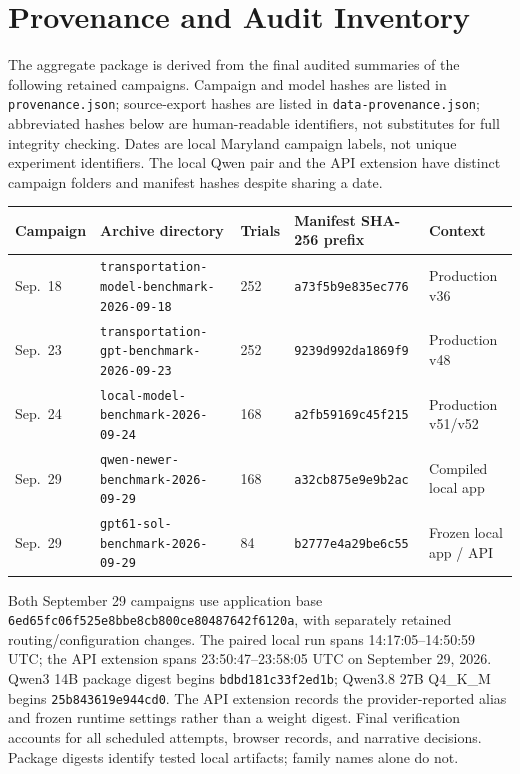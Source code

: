 \documentclass[10pt,twocolumn,letterpaper]{article}
\begin{document}
\section{Provenance and Audit Inventory}\label{app:provenance}
The aggregate package is derived from the final audited summaries of the following retained campaigns. Campaign and model hashes are listed in \texttt{provenance.json}; source-export hashes are listed in \texttt{data-provenance.json}; abbreviated hashes below are human-readable identifiers, not substitutes for full integrity checking. Dates are local Maryland campaign labels, not unique experiment identifiers. The local Qwen pair and the API extension have distinct campaign folders and manifest hashes despite sharing a date.
\begin{center}\small
\begin{tabularx}{\textwidth}{@{}lXlll@{}}
\toprule Campaign & Archive directory & Trials & Manifest SHA-256 prefix & Context\\\midrule
Sep.\ 18 & \texttt{transportation-model-benchmark-2026-09-18} & 252 & \texttt{a73f5b9e835ec776} & Production v36\\
Sep.\ 23 & \texttt{transportation-gpt-benchmark-2026-09-23} & 252 & \texttt{9239d992da1869f9} & Production v48\\
Sep.\ 24 & \texttt{local-model-benchmark-2026-09-24} & 168 & \texttt{a2fb59169c45f215} & Production v51/v52\\
Sep.\ 29 & \texttt{qwen-newer-benchmark-2026-09-29} & 168 & \texttt{a32cb875e9e9b2ac} & Compiled local app\\
Sep.\ 29 & \texttt{gpt61-sol-benchmark-2026-09-29} & 84 & \texttt{b2777e4a29be6c55} & Frozen local app / API\\\bottomrule
\end{tabularx}\end{center}
Both September 29 campaigns use application base \texttt{6ed65fc06f525e8bbe8cb800ce80487642f6120a}, with separately retained routing/configuration changes. The paired local run spans 14:17:05--14:50:59 UTC; the API extension spans 23:50:47--23:58:05 UTC on September 29, 2026. Qwen3 14B package digest begins \texttt{bdbd181c33f2ed1b}; Qwen3.8 27B Q4\_K\_M begins \texttt{25b843619e944cd0}. The API extension records the provider-reported alias and frozen runtime settings rather than a weight digest. Final verification accounts for all scheduled attempts, browser records, and narrative decisions. Package digests identify tested local artifacts; family names alone do not.
\end{document}

